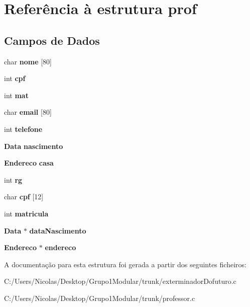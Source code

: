 \section{Referência à estrutura prof}
\label{structprof}
\subsection*{Campos de Dados}
\begin{DoxyCompactItemize}
\item 
\mbox{\label{structprof_a3bb664cb77be91ec94eaa8be817deea1}} 
char {\bfseries nome} [80]
\item 
\mbox{\label{structprof_a29c1287903f5b1b10d953070c6fdc655}} 
int {\bfseries cpf}
\item 
\mbox{\label{structprof_ab88a4aefbc7928dff8e870a1d39e592e}} 
int {\bfseries mat}
\item 
\mbox{\label{structprof_af3b23fd372de3ad83984d11af78517b7}} 
char {\bfseries email} [80]
\item 
\mbox{\label{structprof_ad3ca1329242be21da0e253b47fcc43ca}} 
int {\bfseries telefone}
\item 
\mbox{\label{structprof_aa586b954a2e7367a211671c81cdcb795}} 
\textbf{ Data} {\bfseries nascimento}
\item 
\mbox{\label{structprof_a1959ac5a7a47cb518b472f7e514d82a6}} 
\textbf{ Endereco} {\bfseries casa}
\item 
\mbox{\label{structprof_a287544a62dddcbe99098624a55a3d632}} 
int {\bfseries rg}
\item 
\mbox{\label{structprof_a138496918e0aa46955ff532842300b19}} 
char {\bfseries cpf} [12]
\item 
\mbox{\label{structprof_a238943f62a1db48ca79e9a4223512a11}} 
int {\bfseries matricula}
\item 
\mbox{\label{structprof_ad8391e1740e98dd1a1de33c5ed6d79ea}} 
\textbf{ Data} $\ast$ {\bfseries data\+Nascimento}
\item 
\mbox{\label{structprof_a92c7ef5e47bbf34495969b3da3c4271c}} 
\textbf{ Endereco} $\ast$ {\bfseries endereco}
\end{DoxyCompactItemize}


A documentação para esta estrutura foi gerada a partir dos seguintes ficheiros\+:\begin{DoxyCompactItemize}
\item 
C\+:/\+Users/\+Nicolas/\+Desktop/\+Grupo1\+Modular/trunk/exterminador\+Dofuturo.\+c\item 
C\+:/\+Users/\+Nicolas/\+Desktop/\+Grupo1\+Modular/trunk/professor.\+c\end{DoxyCompactItemize}
